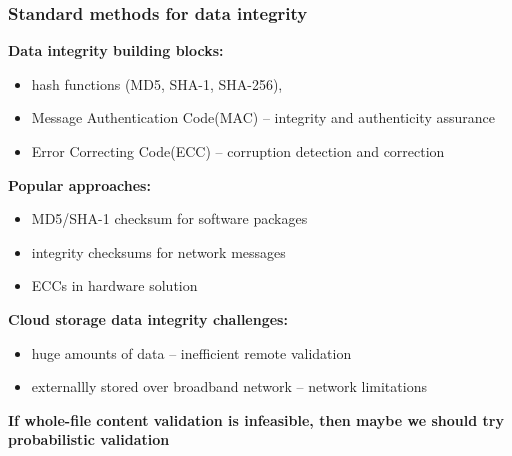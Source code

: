 \documentclass[9pt]{beamer}
\begin{document}
\begin{frame}
\frametitle{\hspace{5mm} \textbf{Standard methods for data integrity}}
\begin{block}{}
\textbf{Data integrity building blocks:}
\begin{itemize}
	\item hash functions (MD5, SHA-1, SHA-256),
	\item Message Authentication Code(MAC) -- integrity and authenticity assurance
	\item Error Correcting Code(ECC) -- corruption detection and correction
\end{itemize}

\textbf{Popular approaches:}
\begin{itemize}
	\item MD5/SHA-1 checksum for software packages
	\item integrity checksums for network messages
	\item ECCs in hardware solution
\end{itemize}
\end{block}

\begin{block}{}
\textbf{Cloud storage data integrity challenges:}
\begin{itemize}
	\item huge amounts of data -- inefficient remote validation
	\item externallly stored over broadband network -- network limitations
\end{itemize}
\textbf{If whole-file content validation is infeasible, then maybe we should try probabilistic validation}
\end{block}
\end{frame}

\end{document}
